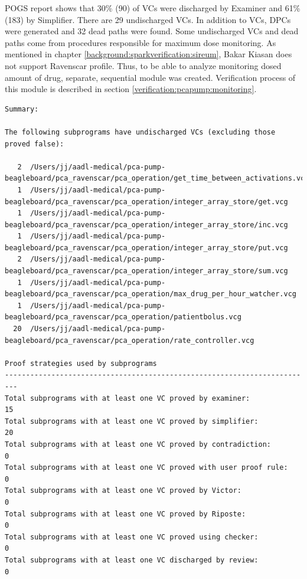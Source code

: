 POGS report shows that 30\% (90) of VCs were discharged by Examiner and 61\% (183) by Simplifier. There are 29 undischarged VCs. In addition to VCs, DPCs were generated and 32 dead paths were found. Some undischarged VCs and dead paths come from procedures responsible for maximum dose monitoring. As mentioned in chapter \ref{background:sparkverification:sireum}, Bakar Kiasan does not support Ravenscar profile. Thus, to be able to analyze monitoring dosed amount of drug, separate, sequential module was created. Verification process of this module is described in section \ref{verification:pcapump:monitoring}.

\singlespacing
\begin{lstlisting}[frame=single, gobble=0, caption={Summary of POGS report for PCA Pump prototype}, label={listing:pca_ravenscar:pogs}]
Summary:

The following subprograms have undischarged VCs (excluding those proved false):

   2  /Users/jj/aadl-medical/pca-pump-beagleboard/pca_ravenscar/pca_operation/get_time_between_activations.vcg
   1  /Users/jj/aadl-medical/pca-pump-beagleboard/pca_ravenscar/pca_operation/integer_array_store/get.vcg
   1  /Users/jj/aadl-medical/pca-pump-beagleboard/pca_ravenscar/pca_operation/integer_array_store/inc.vcg
   1  /Users/jj/aadl-medical/pca-pump-beagleboard/pca_ravenscar/pca_operation/integer_array_store/put.vcg
   2  /Users/jj/aadl-medical/pca-pump-beagleboard/pca_ravenscar/pca_operation/integer_array_store/sum.vcg
   1  /Users/jj/aadl-medical/pca-pump-beagleboard/pca_ravenscar/pca_operation/max_drug_per_hour_watcher.vcg
   1  /Users/jj/aadl-medical/pca-pump-beagleboard/pca_ravenscar/pca_operation/patientbolus.vcg
  20  /Users/jj/aadl-medical/pca-pump-beagleboard/pca_ravenscar/pca_operation/rate_controller.vcg

Proof strategies used by subprograms
-------------------------------------------------------------------------
Total subprograms with at least one VC proved by examiner:             15
Total subprograms with at least one VC proved by simplifier:           20
Total subprograms with at least one VC proved by contradiction:         0
Total subprograms with at least one VC proved with user proof rule:     0
Total subprograms with at least one VC proved by Victor:                0
Total subprograms with at least one VC proved by Riposte:               0
Total subprograms with at least one VC proved using checker:            0
Total subprograms with at least one VC discharged by review:            0


\end{lstlisting}
